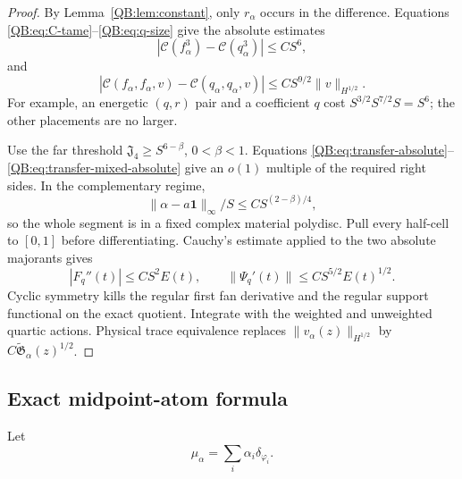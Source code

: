 \documentclass[11pt]{amsart}
\numberwithin{equation}{section}
\theoremstyle{definition}
\theoremstyle{remark}
\newcommand{\Jfour}{\mathfrak J_4}
\newcommand{\Cnull}{\mathcal C}
\begin{document}
\begin{proof}
By Lemma~\ref{QB:lem:constant}, only $r_\alpha$ occurs in the difference.
Equations \eqref{QB:eq:C-tame}--\eqref{QB:eq:q-size} give the absolute estimates
\begin{equation}\label{QB:eq:transfer-absolute}
 |\Cnull(f_\alpha^3)-\Cnull(q_\alpha^3)|\le CS^6,
\end{equation}
and
\begin{equation}\label{QB:eq:transfer-mixed-absolute}
 |\Cnull(f_\alpha,f_\alpha,v)-\Cnull(q_\alpha,q_\alpha,v)|
 \le CS^{9/2}\|v\|_{H^{1/2}}.
\end{equation}
For example, an energetic $(q,r)$ pair and a coefficient $q$ cost
$S^{3/2}S^{7/2}S=S^6$; the other placements are no larger.

Use the far threshold $\Jfour\ge S^{6-\beta}$, $0<\beta<1$.
Equations \eqref{QB:eq:transfer-absolute}--
\eqref{QB:eq:transfer-mixed-absolute} give an $o(1)$ multiple of the required
right sides.  In the complementary regime,
\begin{equation*}
 \|\alpha-a\mathbf1\|_\infty/S
 \le CS^{(2-\beta)/4},
\end{equation*}
so the whole segment is in a fixed complex material polydisc.  Pull every
half-cell to $[0,1]$ before differentiating.  Cauchy's estimate applied to
the two absolute majorants gives
\begin{equation*}
 |F_q''(t)|\le CS^2E(t),
 \qquad \|\Psi_q'(t)\|\le CS^{5/2}E(t)^{1/2}.
\end{equation*}
Cyclic symmetry kills the regular first fan derivative and the regular
support functional on the exact quotient.  Integrate with the weighted and
unweighted quartic actions.  Physical trace equivalence replaces
$\|v_\alpha(z)\|_{H^{1/2}}$ by
$C\widetilde{\mathfrak G}_\alpha(z)^{1/2}$.
\end{proof}

\subsection{Exact midpoint-atom formula}

Let
\begin{equation}\label{QB:eq:mu}
 \mu_\alpha=\sum_i\alpha_i\delta_{\varphi_i}.
\end{equation}
\end{document}
